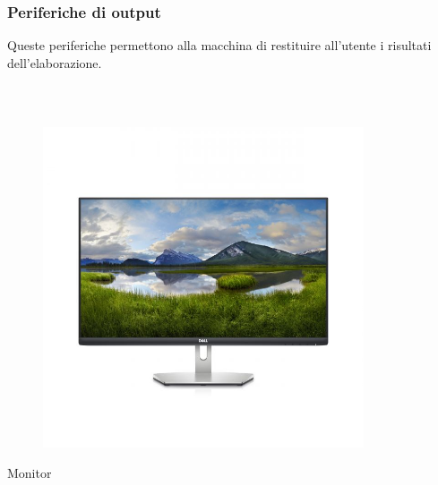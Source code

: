 \documentclass[handout]{beamer}
\begin{document}
\begin{frame}
\frametitle{Periferiche di output}
Queste periferiche permettono alla macchina di \alert<1>{restituire all'utente i risultati dell'elaborazione}.

~

\begin{columns}
\begin{column}{.22\textwidth}
  \begin{center}
  \begin{figure}
    \includegraphics[width=\columnwidth]{img/monitor.jpg}
  \end{figure}
  Monitor
  \end{center}
\end{column}
\begin{column}{.22\textwidth}
  \begin{center}
    \begin{figure}

\end{figure}
\end{center}
\end{column}
\end{columns}
\end{frame}
\end{document}

